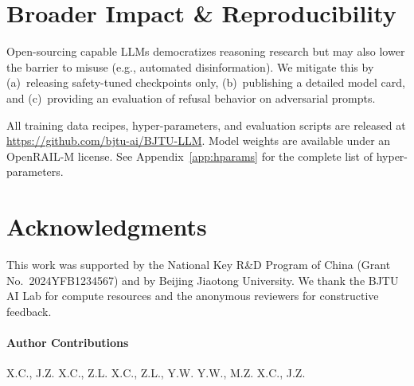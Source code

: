 
\section*{\normalfont\color{bjtublue}Broader Impact \& Reproducibility}

\begin{broaderimpact}
Open-sourcing capable LLMs democratizes reasoning research but may also lower
the barrier to misuse (e.g., automated disinformation). We mitigate this by
(a)~releasing safety-tuned checkpoints only, (b)~publishing a detailed
model card, and (c)~providing an evaluation of refusal behavior on
adversarial prompts.
\end{broaderimpact}

\begin{reproducibility}
All training data recipes, hyper-parameters, and evaluation scripts are
released at \url{https://github.com/bjtu-ai/BJTU-LLM}. Model weights are
available under an OpenRAIL-M license. See Appendix~\ref{app:hparams} for
the complete list of hyper-parameters.
\end{reproducibility}

\section*{\normalfont\color{bjtublue}Acknowledgments}

This work was supported by the National Key R\&D Program of China (Grant
No.~2024YFB1234567) and by Beijing Jiaotong University. We thank the BJTU AI
Lab for compute resources and the anonymous reviewers for constructive
feedback.

\paragraph{Author Contributions}
 X.C., J.Z. \quad
{} X.C., Z.L. \quad
{} X.C., Z.L., Y.W. \quad
{} Y.W., M.Z. \quad
{} X.C., J.Z.
